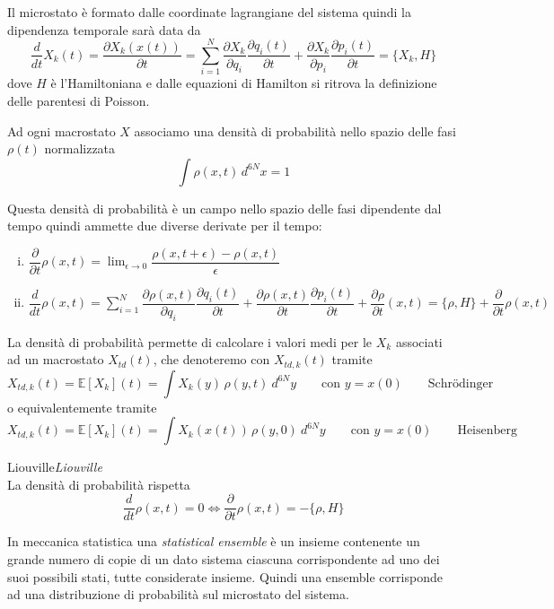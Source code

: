 \documentclass[11pt,a4paper,twoside]{book}
\newenvironment{teorema}[1][\empty]{\begin{Teorema}{
\ifx\empty#1\relax\else\mdseries\itshape#1\\\fi
}{}}{\end{Teorema}}
\numberwithin{equation}{section} %
\begin{document}
Il microstato è formato dalle coordinate lagrangiane del sistema quindi la dipendenza temporale sarà data da
\begin{equation}
\dfrac{d}{dt}X_k(t)=\dfrac{\partial X_k(x(t))}{\partial t}=\sum_{i=1}^N \dfrac{\partial X_k}{\partial q_i}\dfrac{\partial q_i (t)}{\partial t} +\dfrac{\partial X_k}{\partial p_i}\dfrac{\partial p_i (t)}{\partial t} = \{X_k,H\}
\end{equation}
dove $H$ è l'Hamiltoniana e dalle equazioni di Hamilton si ritrova la definizione delle parentesi di Poisson.

Ad ogni macrostato $X$ associamo una densità di probabilità nello spazio delle fasi $\rho(t)$ normalizzata
\[
\int \rho(x,t) \, d^{6N}x =1
\]

Questa densità di probabilità è un campo nello spazio delle fasi dipendente dal tempo quindi ammette due diverse derivate per il tempo:
\begin{enumerate}[i.]
\item $\displaystyle \dfrac{\partial}{\partial t}\rho(x,t)=\lim_{\epsilon\rightarrow 0}\dfrac{\rho(x,t+\epsilon)-\rho(x,t)}{\epsilon}$
\item $\displaystyle \dfrac{d}{dt}\rho(x,t)=\sum_{i=1}^N \dfrac{\partial \rho(x,t)}{\partial q_i}\dfrac{\partial q_i(t)}{\partial t} + \dfrac{\partial \rho(x,t)}{\partial t}\dfrac{\partial p_i(t)}{\partial t} + \dfrac{\partial \rho}{\partial t}(x,t)=\{\rho,H\}+\dfrac{\partial}{\partial t}\rho(x,t)$
\end{enumerate}

La densità di probabilità permette di calcolare i valori medi per le $X_k$ associati ad un macrostato $X_{td}(t)$, che denoteremo con $X_{td,k}(t)$ tramite
\begin{equation}
X_{td,k}(t)=\mathbb{E}[X_k](t)=\int X_k(y)\, \rho(y,t) \> d^{6N}y \qquad \text{con } y=x(0) \qquad \text{Schrödinger}
\end{equation}
o equivalentemente tramite
\begin{equation}
X_{td,k}(t)=\mathbb{E}[X_k](t)=\int X_k(x(t))\, \rho(y,0) \> d^{6N}y \qquad \text{con } y=x(0) \qquad \text{Heisenberg}
\end{equation}

\begin{teorema}[Liouville]
La densità di probabilità rispetta
\[
\dfrac{d}{dt}\rho(x,t)=0 \iff \dfrac{\partial}{\partial t}\rho(x,t)=-\{\rho,H\}
\]
\end{teorema}

In meccanica statistica una \textit{statistical ensemble} è un insieme contenente un grande numero di copie di un dato sistema ciascuna corrispondente ad uno dei suoi possibili stati, tutte considerate insieme. Quindi una ensemble corrisponde ad una distribuzione di probabilità sul microstato del sistema.
\end{document}
